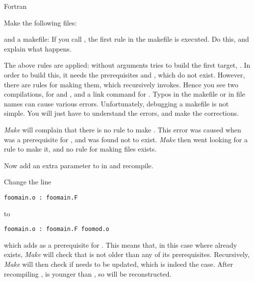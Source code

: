 
 {Fortran}

Make the following files:

and a makefile:
If you call , the first rule in the makefile is executed. Do
this, and explain what happens.

  {The above rules are applied:  without arguments tries to
    build the first target, . In order to build this, it
    needs the prerequisites  and , which do not
    exist. However, there are rules for making them, which 
    recursively invokes. Hence you see two compilations, for 
    and , and a link command for .}
  {Typos in the makefile or in file names can cause various
    errors. Unfortunately, debugging a makefile is not simple. You
    will just have to understand the errors, and make the
    corrections.}

  {\emph{Make} will complain that there is no rule to make
    . This error was caused when  was a
    prerequisite for , and was found not to
    exist. \emph{Make} then went looking for a rule to make it, and no
    rule for making  files exists.}{}

Now add an extra
parameter to  in  and recompile. 


Change the line
\begin{verbatim}
foomain.o : foomain.F
\end{verbatim}
to
\begin{verbatim}
foomain.o : foomain.F foomod.o
\end{verbatim}
which adds  as a prerequisite for . This
means that, in this case where  already exists,
\emph{Make} will check that  is not older than any of its
prerequisites. Recursively, \emph{Make} will then check if
 needs to be updated, which is indeed the case.
After recompiling ,  is younger than
, so  will be reconstructed.

